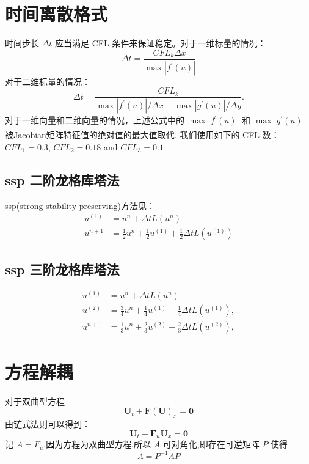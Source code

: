 \documentclass{book}
\begin{document}
\section{时间离散格式}
时间步长 $\Delta t$  应当满足 CFL 条件来保证稳定。对于一维标量的情况：
\begin{equation}
    \Delta t=\frac{C F L_{k} \Delta x}{\max \left|f^{\prime}(u)\right|}
\end{equation}
对于二维标量的情况：
\begin{equation}
    \Delta t=\frac{C F L_{k}}{\max \left|f^{\prime}(u)\right| / \Delta x+\max \left|g^{\prime}(u)\right| / \Delta y} .
\end{equation}
对于一维向量和二维向量的情况，上述公式中的 $\max \left|f^{\prime}(u)\right|$ 和 $\max \left|g^{\prime}(u)\right|$  被Jacobian矩阵特征值的绝对值的最大值取代. 我们使用如下的 CFL 数\cite{RN109}\cite{RN133}\cite{RN148}：  $CFL_1=0.3$, $C F L_{2}=0.18$  and  $C F L_{3}=0.1$

\subsection{ssp 二阶龙格库塔法}
ssp(strong stability-preserving)方法见：\cite{RN96}
\begin{equation}
    \begin{aligned}
        u^{(1)} & =u^{n}+\Delta t L\left(u^{n}\right)                                               \\
        u^{n+1} & =\frac{1}{2} u^{n}+\frac{1}{2} u^{(1)}+\frac{1}{2} \Delta t L\left(u^{(1)}\right)
    \end{aligned}
\end{equation}
\subsection{ssp 三阶龙格库塔法}
\begin{equation}
    \begin{aligned}
        u^{(1)} & =u^{n}+\Delta t L\left(u^{n}\right)                                                \\
        u^{(2)} & =\frac{3}{4} u^{n}+\frac{1}{4} u^{(1)}+\frac{1}{4} \Delta t L\left(u^{(1)}\right), \\
        u^{n+1} & =\frac{1}{3} u^{n}+\frac{2}{3} u^{(2)}+\frac{2}{3} \Delta t L\left(u^{(2)}\right),
    \end{aligned}
\end{equation}

\section{方程解耦}
对于双曲型方程
\begin{equation}
    \mathbf{U}_{t}+\mathbf{F}(\mathbf{U})_{x}=\mathbf{0}
\end{equation}
由链式法则可以得到：
\begin{equation}
    \mathbf{U}_{t}+\mathbf{F}_u\mathbf{U}_{x}=\mathbf{0}
\end{equation}
记 $A=F_u$,因为方程为双曲型方程,所以 $A$ 可对角化,即存在可逆矩阵 $P$ 使得
\begin{equation}
    \Lambda = P^{-1}AP
\end{equation}
\end{document}
